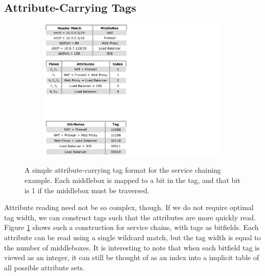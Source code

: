 \begin{itemize}
{%






\subsection{Attribute-Carrying Tags}

\begin{figure}[t!] 
\begin{minipage}{1\linewidth}
\begin{subfigure}[c]{0.96\linewidth}
\includegraphics[trim={0 0 19cm 19.5cm}, clip, width=\linewidth]{figures/mbox_path_example3}
\end{subfigure} 
\end{minipage} 
\caption{A simple attribute-carrying tag format for the service chaining example. Each middlebox is mapped to a bit in the tag, and that bit is 1 if the middlebox must be traversed.}
\label{fig:att_tags}
\end{figure}

Attribute reading need not be so complex, though. If we do not require optimal tag width, we can construct tags such that the attributes are more quickly read. Figure \ref{fig:att_tags} shows such a construction for service chains, with tags as bitfields. Each attribute can be read using a single wildcard match, but the tag width is equal to the number of middleboxes. It is interesting to note that when each bitfield tag is viewed as an integer, it can still be thought of as an index into a implicit table of all possible attribute sets. 


}
\end{itemize}
